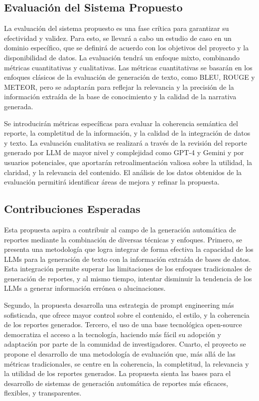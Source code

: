 \subsection{Evaluación del Sistema Propuesto}

La evaluación del sistema propuesto es una fase crítica para garantizar su efectividad y validez. Para esto, se llevará a cabo un estudio de caso en un dominio específico, que se definirá de acuerdo con los objetivos del proyecto y la disponibilidad de datos. La evaluación tendrá un enfoque mixto, combinando métricas cuantitativas y cualitativas. Las métricas cuantitativas se basarán en los enfoques clásicos de la evaluación de generación de texto, como BLEU, ROUGE y METEOR, pero se adaptarán para reflejar la relevancia y la precisión de la información extraída de la base de conocimiento y la calidad de la narrativa generada. 

Se introducirán métricas específicas para evaluar la coherencia semántica del reporte, la completitud de la información, y la calidad de la integración de datos y texto. La evaluación cualitativa se realizará a través de la revisión del reporte generado por LLM de mayor nivel y complejidad como GPT-4 y Gemini y por usuarios potenciales, que aportarán retroalimentación valiosa sobre la utilidad, la claridad, y la relevancia del contenido. El análisis de los datos obtenidos de la evaluación permitirá identificar áreas de mejora y refinar la propuesta.


\subsection{Contribuciones Esperadas}

Esta propuesta aspira a contribuir al campo de la generación automática de reportes mediante la combinación de diversas técnicas y enfoques. Primero, se presenta una metodología que logra integrar de forma efectiva la capacidad de los LLMs para la generación de texto con la información extraída de bases de datos. Esta integración permite superar las limitaciones de los enfoques tradicionales de generación de reportes, y al mismo tiempo, intentar disminuir la tendencia de los LLMs a generar información errónea o alucinaciones.

Segundo, la propuesta desarrolla una estrategia de prompt engineering más sofisticada, que ofrece mayor control sobre el contenido, el estilo, y la coherencia de los reportes generados. Tercero, el uso de una base tecnológica open-source democratiza el acceso a la tecnología, haciendo más fácil su adopción y adaptación por parte de la comunidad de investigadores. Cuarto, el proyecto se propone el desarrollo de una metodología de evaluación que, más allá de las métricas tradicionales, se centre en la coherencia, la completitud, la relevancia y la utilidad de los reportes generados. La propuesta sienta las bases para el desarrollo de sistemas de generación automática de reportes más eficaces, flexibles, y transparentes.

